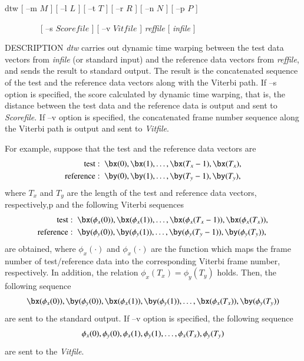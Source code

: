 \hypertarget{dtw}{}
\begin{synopsis}
\item[dtw] [ --m $M$ ]  [ --l $L$ ]  [ --t $T$ ]  [ --r $R$ ]
           [ --n $N$ ]  [ --p $P$ ]
 \item [\ ~~~~~~~] [ --s $Scorefile$ ]  [ --v $Vitfile$ ]
 {\em reffile} [ {\em infile} ]
\end{synopsis}

\begin{qsection}{DESCRIPTION}
 {\em dtw} carries out dynamic time warping between
 the test data vectors from {\em infile} (or standard input)
 and the reference data vectors from {\em reffile},
 and sends the result to standard output.
 The result is the concatenated sequence
 of the test and the reference data vectors
 along with the Viterbi path.
 If --s option is specified,
 the score calculated by dynamic time warping,
 that is, the distance between the test data and the reference data
 is output and sent to {\em Scorefile}.
 If --v option is specified,
 the concatenated frame number sequence
 along the Viterbi path
 is output and sent to {\em Vitfile}.

 For example, suppose that the test and the reference data vectors are
 \begin{align}
  \mathrm{test} :\;\; & \bx(0), \bx(1), \dots, \bx(T_x - 1), \bx(T_x), \notag \\
  \mathrm{reference}  :\;\; & \by(0), \by(1), \dots, \by(T_y - 1), \by(T_y), \notag
 \end{align}
 where $T_x$ and $T_y$ are the length of the test and reference data vectors,
 respectively,p
 and the following Viterbi sequences
 \begin{align}
  \mathrm{test} :\;\; & \bx(\phi_x(0)), \bx(\phi_x(1)), \dots, \bx(\phi_x(T_x - 1)),
  \bx(\phi_{x}(T_x)), \notag \\
  \mathrm{reference}  :\;\; & \by(\phi_y(0)), \by(\phi_y(1)), \dots,
  \by(\phi_y(T_y - 1)), \by(\phi_y(T_y)), \notag
 \end{align}
 are obtained, where $\phi_x(\cdot)$ and $\phi_x(\cdot)$ are the function which
 maps the frame number of test/reference data
 into the corresponding Viterbi frame number, respectively.
 In addition, the relation $\phi_x(T_x)=\phi_y(T_y)$ holds.
 Then, the following sequence
 \begin{align}
  \bx(\phi_x(0)), \by(\phi_y(0)),
  \bx(\phi_x(1)), \by(\phi_y(1)),
  \dots, \bx(\phi_{x}(T_x)), \by(\phi_y(T_y)) \notag
 \end{align}
 are sent to the standard output.
 If --v option is specified, the following sequence
 \begin{align}
  \phi_x(0), \phi_y(0),
  \phi_x(1), \phi_y(1),
  \dots, \phi_{x}(T_x), \phi_y(T_y) \notag
 \end{align}
 are sent to the {\em Vitfile}.


\end{qsection}
